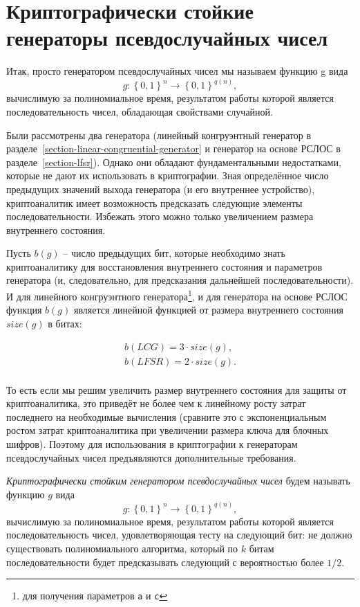 \section[КСГПСЧ]{Криптографически стойкие генераторы псевдослучайных чисел}\label{section-crypto-random}

Итак, просто генератором псевдослучайных чисел мы называем функцию g вида
	\[g: \left\{0, 1\right\}^{n} \to \left\{0, 1\right\}^{q\left(n\right)},\]
вычислимую за полиномиальное время, результатом работы которой является последовательность чисел, обладающая свойствами случайной.

Были рассмотрены два генератора (линейный конгруэнтный генератор в разделе~\ref{section-linear-congruential-generator} и генератор на основе РСЛОС в разделе~\ref{section-lfsr}). Однако они обладают фундаментальными недостатками, которые не дают их использовать в криптографии. Зная определённое число предыдущих значений выхода генератора (и его внутреннее устройство), криптоаналитик имеет возможность предсказать следующие элементы последовательности. Избежать этого можно только увеличением размера внутреннего состояния.

Пусть $b \left( g \right)$ -- число предыдущих бит, которые необходимо знать криптоаналитику для восстановления внутреннего состояния и параметров генератора (и, следовательно, для предсказания дальнейшей последовательности). И для линейного конгруэнтного генератора\footnote{для получения параметров \texttt{a} и \texttt{c}}, и для генератора на основе РСЛОС функция $b (g)$ является линейной функцией от размера внутреннего состояния $size\left( g \right)$ в битах:

\[\begin{array}{l}
	b \left( LCG \right) = 3 \cdot size\left( g \right), \\
	b \left( LFSR \right) = 2 \cdot size\left( g \right). \\
\end{array}\]

То есть если мы решим увеличить размер внутреннего состояния для защиты от криптоаналитика, это приведёт не более чем к линейному росту затрат последнего на необходимые вычисления (сравните это с экспоненциальным ростом затрат криптоаналитика при увеличении размера ключа для блочных шифров). Поэтому для использования в криптографии к генераторам псевдослучайных чисел предъявляются дополнительные требования.

\emph{Криптографически стойким генератором псевдослучайных чисел} будем называть функцию $g$ вида
	\[g: \left\{0, 1\right\}^{n} \to \left\{0, 1\right\}^{q\left(n\right)},\] 
вычислимую за полиномиальное время, результатом работы которой является последовательность чисел, удовлетворяющая тесту на следующий бит: не должно существовать полиномиального алгоритма, который по $k$ битам последовательности будет предсказывать следующий с вероятностью более $1/2$.

